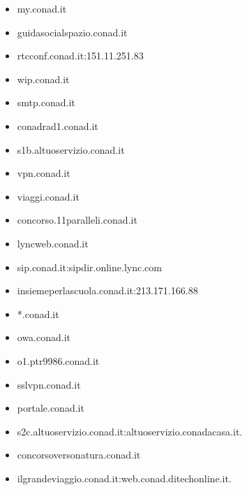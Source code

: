 \documentclass{article}
\begin{document}
\scriptsize
\begin{itemize}
    
        \item my.conad.it
    
        \item guidasocialspazio.conad.it
    
        \item rtcconf.conad.it:151.11.251.83
    
        \item wip.conad.it
    
        \item smtp.conad.it
    
        \item conadrad1.conad.it
    
        \item s1b.altuoservizio.conad.it
    
        \item vpn.conad.it
    
        \item viaggi.conad.it
    
        \item concorso.11paralleli.conad.it
    
        \item lyncweb.conad.it
    
        \item sip.conad.it:sipdir.online.lync.com
    
        \item insiemeperlascuola.conad.it:213.171.166.88
    
        \item *.conad.it
    
        \item owa.conad.it
    
        \item o1.ptr9986.conad.it
    
        \item sslvpn.conad.it
    
        \item portale.conad.it
    
        \item s2c.altuoservizio.conad.it:altuoservizio.conadacasa.it.
    
        \item concorsoversonatura.conad.it
    
        \item ilgrandeviaggio.conad.it:web.conad.ditechonline.it.
    

\end{itemize}
\end{document}
